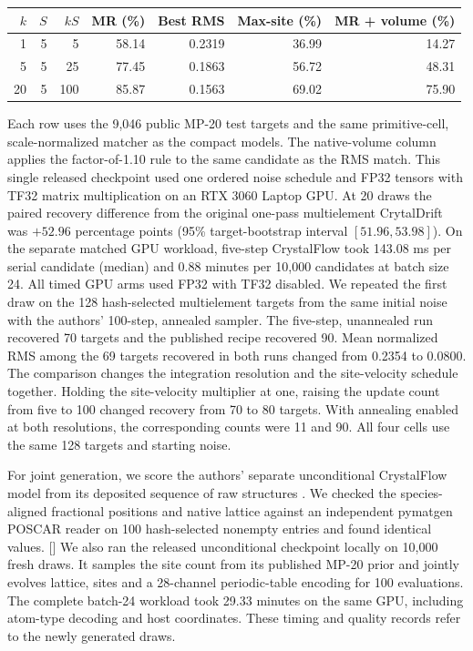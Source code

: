 \begin{center}\small\begin{tabular}{rrrrrrr}\hline
$k$ & $S$ & $kS$ & MR (\%) & Best RMS & Max-site (\%) & MR + volume (\%)\\\hline
1 & 5 & 5 & 58.14 & 0.2319 & 36.99 & 14.27\\
5 & 5 & 25 & 77.45 & 0.1863 & 56.72 & 48.31\\
20 & 5 & 100 & 85.87 & 0.1563 & 69.02 & 75.90\\
\hline\end{tabular}\end{center}
Each row uses the 9,046 public MP-20 test targets and the same primitive-cell, scale-normalized matcher as the compact models. The native-volume column applies the factor-of-1.10 rule to the same candidate as the RMS match. This single released checkpoint used one ordered noise schedule and FP32 tensors with TF32 matrix multiplication on an RTX 3060 Laptop GPU.
At 20 draws the paired recovery difference from the original one-pass multielement CrytalDrift was $+52.96$ percentage points (95\% target-bootstrap interval $[51.96,53.98]$).
On the separate matched GPU workload, five-step CrystalFlow took 143.08 ms per serial candidate (median) and 0.88 minutes per 10,000 candidates at batch size 24. All timed GPU arms used FP32 with TF32 disabled.
We repeated the first draw on the 128 hash-selected multielement targets from the same initial noise with the authors' 100-step, annealed sampler. The five-step, unannealed run recovered 70 targets and the published recipe recovered 90. Mean normalized RMS among the 69 targets recovered in both runs changed from 0.2354 to 0.0800.
The comparison changes the integration resolution and the site-velocity schedule together.
Holding the site-velocity multiplier at one, raising the update count from five to 100 changed recovery from 70 to 80 targets. With annealing enabled at both resolutions, the corresponding counts were 11 and 90. All four cells use the same 128 targets and starting noise.

For joint generation, we score the authors' separate unconditional CrystalFlow model from its deposited sequence of raw structures \cite{crystalflow}. We checked the species-aligned fractional positions and native lattice against an independent pymatgen POSCAR reader on 100 hash-selected nonempty entries and found identical values. []
We also ran the released unconditional checkpoint locally on 10,000 fresh draws. It samples the site count from its published MP-20 prior and jointly evolves lattice, sites and a 28-channel periodic-table encoding for 100 evaluations. The complete batch-24 workload took 29.33 minutes on the same GPU, including atom-type decoding and host coordinates. These timing and quality records refer to the newly generated draws.
